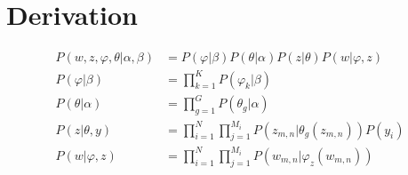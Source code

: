 \documentclass[12pt,a4paper]{amsart}
\begin{document}
\section{Derivation}
\begin{align}
P(w, z, \varphi, \theta | \alpha, \beta) &= P(\varphi | \beta)P(\theta | \alpha)P(z | \theta)P(w | \varphi, z)\\
P(\varphi | \beta) &= \prod\limits_{k=1}^K P(\varphi_k|\beta)\\
P(\theta | \alpha) &= \prod\limits_{g=1}^G P(\theta_g|\alpha)\\
P(z | \theta, y) &= \prod\limits_{i=1}^N \prod\limits_{j=1}^{M_i} P(z_{m,n}|\theta_g(z_{m,n}))P(y_i)\\
P(w | \varphi, z) &= \prod\limits_{i=1}^N \prod\limits_{j=1}^{M_i} P(w_{m,n}|\varphi_z(w_{m,n}))
\end{align}


\end{document}
